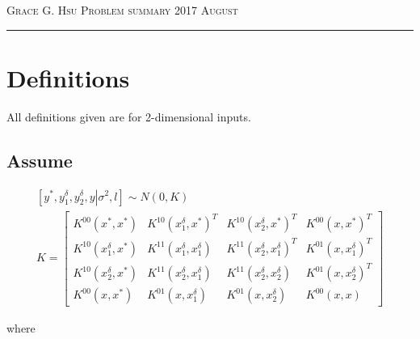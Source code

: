 \documentclass[12pt]{amsart}
\begin{document}
\thispagestyle{empty}

{\scshape Grace G. Hsu} \hfill {\scshape Problem summary} \hfill {\scshape 2017 August}
 
\medskip

\hrule

\bigskip



\section{Definitions}
All definitions given are for 2-dimensional inputs. 
\subsection{Assume}
  \begin{gather}
\left[ {{y^*},y_1^\delta ,y_2^\delta, y \left| {{\sigma ^2},l} \right.} \right] \sim N\left( {0,K} \right) \\
K = \left[ {\begin{array}{*{20}{c}}
{{K^{00}}\left( {{x^*},{x^*}} \right)}&{{K^{10}}{{\left( {x_1^\delta ,{x^*}} \right)}^T}}&{{K^{10}}{{\left( {x_2^\delta ,{x^*}} \right)}^T}}&{{K^{00}}{{\left( {x,{x^*}} \right)}^T}}\\
{{K^{10}}\left( {x_1^\delta ,{x^*}} \right)}&{{K^{11}}\left( {x_1^\delta ,x_1^\delta } \right)}&{{K^{11}}{{\left( {x_2^\delta ,x_1^\delta } \right)}^T}}&{{K^{01}}{{\left( {x,x_1^\delta } \right)}^T}}\\
{{K^{10}}\left( {x_2^\delta ,{x^*}} \right)}&{{K^{11}}\left( {x_2^\delta ,x_1^\delta } \right)}&{{K^{11}}\left( {x_2^\delta ,x_2^\delta } \right)}&{{K^{01}}{{\left( {x,x_2^\delta } \right)}^T}}\\
{{K^{00}}\left( {x,{x^*}} \right)}&{{K^{01}}\left( {x,x_1^\delta } \right)}&{{K^{01}}\left( {x,x_2^\delta } \right)}&{{K^{00}}\left( {x,x} \right)}
\end{array}} \right]
  \end{gather}

    where 
    
\end{document}
